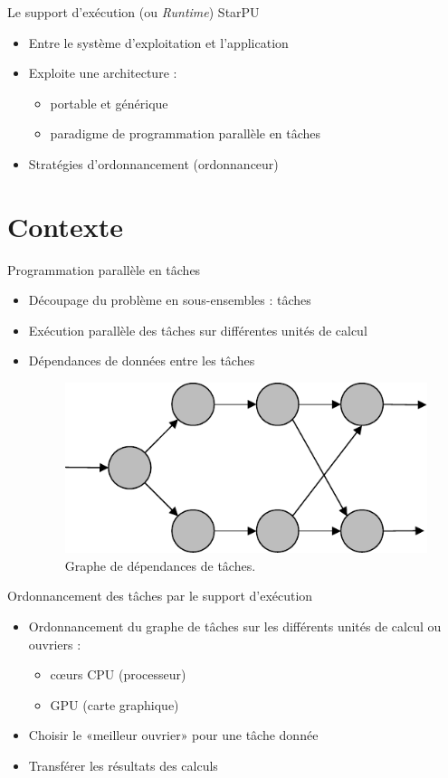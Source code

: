 \documentclass[9pt]{beamer}
\begin{document}
\begin{frame}{Le support d'exécution (ou \textit{Runtime}) StarPU}
  \vfill
  \begin{itemize}
  \item Entre le système d'exploitation et l'application
    \vfill
  \item Exploite une architecture :
    \vfill
    \begin{itemize}
    \item portable et générique
      \vfill
    \item paradigme de programmation parallèle en tâches
    \end{itemize}
    \vfill
  \item Stratégies d'ordonnancement (ordonnanceur)
  \end{itemize}
  \vfill
\end{frame}

\section{Contexte}

\begin{frame}{\textcolor{inriaGrey}{Programmation parallèle en tâches}}
  \vfill
  \begin{itemize}
    \vfill
  \item Découpage du problème en sous-ensembles : tâches \vfill
  \item Exécution parallèle des tâches sur différentes unités de calcul \vfill
  \item Dépendances de données entre les tâches \vfill
    \begin{figure}
      \centering
      \includegraphics[width=0.5\linewidth]{img/task-deps.pdf}
      \caption{Graphe de dépendances de tâches.}
    \end{figure}
    \vfill
  \end{itemize}
\end{frame}

\begin{frame}{\textcolor{inriaGrey}{Ordonnancement des tâches par le support d'exécution}}
  \begin{itemize}
  \item Ordonnancement du graphe de tâches sur les différents unités de calcul
    ou ouvriers : \vfill
    \begin{itemize}
    \item cœurs CPU (processeur) \vfill
    \item GPU (carte graphique)
    \end{itemize}
      \vfill
    \item Choisir le «meilleur ouvrier» pour une tâche donnée \vfill
  \item Transférer les résultats des calculs \vfill
  \end{itemize}
\end{frame}
\end{document}
